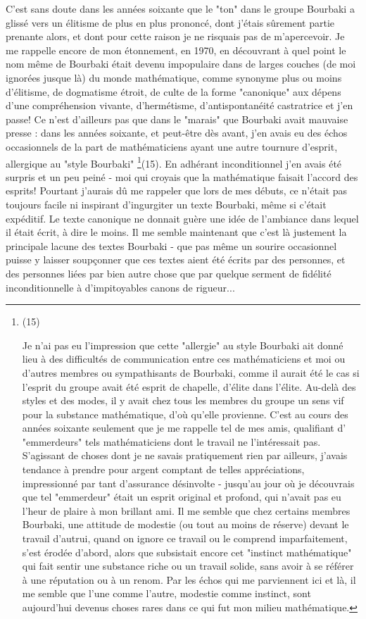 C'est sans doute dans les années soixante que le "ton" dans le groupe Bourbaki a glissé vers un élitisme de plus en plus prononcé, dont j'étais sûrement partie prenante alors, et dont pour cette raison je ne risquais pas de m'apercevoir. Je me rappelle encore de mon étonnement, en 1970, en découvrant à quel point le nom même de Bourbaki était devenu impopulaire dans de larges couches (de moi ignorées jusque là) du monde mathématique, comme synonyme plus ou moins d'élitisme, de dogmatisme étroit, de culte de la forme "canonique" aux dépens d'une compréhension vivante, d'hermétisme, d'antispontanéité castratrice et j'en passe! Ce n'est d'ailleurs pas que dans le "marais" que Bourbaki avait mauvaise presse : dans les années soixante, et peut-être dès avant, j'en avais eu des échos occasionnels de la part de mathématiciens ayant une autre tournure d'esprit, allergique au "style Bourbaki" \footnote{(15)\par Je n'ai pas eu l'impression que cette "allergie" au style Bourbaki ait donné lieu à des difficultés de communication entre ces mathématiciens et moi ou d'autres membres ou sympathisants de Bourbaki, comme il aurait été le cas si l'esprit du groupe avait été esprit de chapelle, d'élite dans l'élite. Au-delà des styles et des modes, il y avait chez tous les membres du groupe un sens vif pour la substance mathématique, d'où qu'elle provienne. C'est au cours des années soixante seulement que je me rappelle tel de mes amis, qualifiant d' "emmerdeurs" tels mathématiciens dont le travail ne l'intéressait pas. S'agissant de choses dont je ne savais pratiquement rien par ailleurs, j'avais tendance à prendre pour argent comptant de telles appréciations, impressionné par tant d'assurance désinvolte - jusqu'au jour où je découvrais que tel "emmerdeur" était un esprit original et profond, qui n'avait pas eu l'heur de plaire à mon brillant ami. Il me semble que chez certains membres Bourbaki, une attitude de modestie (ou tout au moins de réserve) devant le travail d'autrui, quand on ignore ce travail ou le comprend imparfaitement, s'est érodée d'abord, alors que subsistait encore cet "instinct mathématique" qui fait sentir une substance riche ou un travail solide, sans avoir à se référer à une réputation ou à un renom. Par les échos qui me parviennent ici et là, il me semble que l'une comme l'autre, modestie comme instinct, sont aujourd'hui devenus choses rares dans ce qui fut mon milieu mathématique.}(15). En adhérant inconditionnel j'en avais été surpris et un peu peiné - moi qui croyais que la mathématique faisait l'accord des esprits! Pourtant j'aurais dû me rappeler que lors de mes débuts, ce n'était pas toujours facile ni inspirant d'ingurgiter un texte Bourbaki, même si c'était expéditif. Le texte canonique ne donnait guère une idée de l'ambiance dans lequel il était écrit, à dire le moins. Il me semble maintenant que c'est là justement la principale lacune des textes Bourbaki - que pas même un sourire occasionnel puisse y laisser soupçonner que ces textes aient été écrits par des personnes, et des personnes liées par bien autre chose que par quelque serment de fidélité inconditionnelle à d'impitoyables canons de rigueur...

